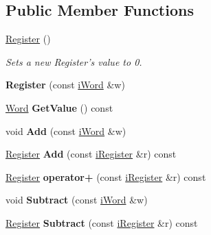 \subsection*{Public Member Functions}
\begin{DoxyCompactItemize}
\item 
\hypertarget{classRegister_a669b96861697fb8c04bce79f04390c66}{
\hyperlink{classRegister_a669b96861697fb8c04bce79f04390c66}{Register} ()}
\label{classRegister_a669b96861697fb8c04bce79f04390c66}

\begin{DoxyCompactList}\small\item\em Sets a new Register's value to 0. \item\end{DoxyCompactList}\item 
\hypertarget{classRegister_a1a18c39fc5cbc479c0f32fb9e0172376}{
{\bfseries Register} (const \hyperlink{classiWord}{iWord} \&w)}
\label{classRegister_a1a18c39fc5cbc479c0f32fb9e0172376}

\item 
\hypertarget{classRegister_a379734c28ab8258ce528a96de24cfa1a}{
\hyperlink{classWord}{Word} {\bfseries GetValue} () const }
\label{classRegister_a379734c28ab8258ce528a96de24cfa1a}

\item 
\hypertarget{classRegister_a73d8564754d7ddb7e8349001010e688b}{
void {\bfseries Add} (const \hyperlink{classiWord}{iWord} \&w)}
\label{classRegister_a73d8564754d7ddb7e8349001010e688b}

\item 
\hypertarget{classRegister_a9d9c6801db55e8706eb242b1e0e0fa3f}{
\hyperlink{classRegister}{Register} {\bfseries Add} (const \hyperlink{classiRegister}{iRegister} \&r) const }
\label{classRegister_a9d9c6801db55e8706eb242b1e0e0fa3f}

\item 
\hypertarget{classRegister_a55de0c3b5f8fe14df7c24bce777204e0}{
\hyperlink{classRegister}{Register} {\bfseries operator+} (const \hyperlink{classiRegister}{iRegister} \&r) const }
\label{classRegister_a55de0c3b5f8fe14df7c24bce777204e0}

\item 
\hypertarget{classRegister_a726a720b6bcca282945f1c0a65ca0dd4}{
void {\bfseries Subtract} (const \hyperlink{classiWord}{iWord} \&w)}
\label{classRegister_a726a720b6bcca282945f1c0a65ca0dd4}

\item 
\hypertarget{classRegister_a05132a4a62f5c6883fdf78731970ab6a}{
\hyperlink{classRegister}{Register} {\bfseries Subtract} (const \hyperlink{classiRegister}{iRegister} \&r) const }
\label{classRegister_a05132a4a62f5c6883fdf78731970ab6a}


\end{DoxyCompactItemize}
